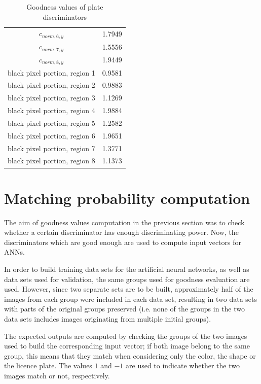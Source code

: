 \documentclass[times, utf8, zavrsni]{fer}
\begin{document}
\begin{table}[!ht]
\begin{center}
{\begin{tabular}{c|c}
$c_{norm, 6, y}$                                &    1.7949 \\
$c_{norm, 7, y}$                                &    1.5556 \\
$c_{norm, 8, y}$                                &    1.9449 \\
black pixel portion, region 1                   &    0.9581 \\ 
black pixel portion, region 2                   &    0.9883 \\ 
black pixel portion, region 3                   &    1.1269 \\ 
black pixel portion, region 4                   &    1.9884 \\ 
black pixel portion, region 5                   &    1.2582 \\ 
black pixel portion, region 6                   &    1.9651 \\ 
black pixel portion, region 7                   &    1.3771 \\ 
black pixel portion, region 8                   &    1.1373 \\
\end{tabular} }
\end{center}
\caption{\footnotesize Goodness values of plate discriminators}
\label{table :color-discriminators-goodnesses}
\end{table}

\section{Matching probability computation}

The aim of goodness values computation in the previous section was to check
whether a certain discriminator has enough discriminating power. Now, the
discriminators which are good enough are used to compute input vectors for ANNs.

In order to build training data sets for the artificial neural networks, as well
as data sets used for validation, the same groups used for goodness evaluation
are used. However, since two separate sets are to be built, approximately half
of the images from each group were included in each data set, resulting in two
data sets with parts of the original groups preserved (i.e. none of the
groups in the two data sets includes images originating from multiple initial
groups).

The expected outputs are computed by checking the groups of the two images used
to build the corresponding input vector; if both image belong to the same group,
this means that they match when considering only the color, the shape or the
licence plate. The values $1$ and $-1$ are used to indicate whether the two
images match or not, respectively.
\end{document}
